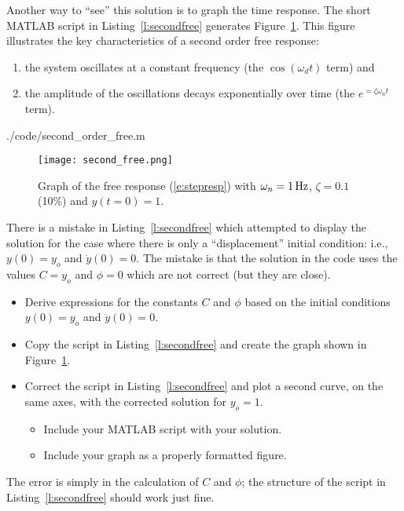 Another way to ``see'' this solution is to graph the time response.  The short MATLAB script in Listing~\ref{l:secondfree} generates Figure~\ref{f:secondfree}.  This figure illustrates the key characteristics of a second order free response:
\begin{enumerate}
\item the system oscillates at a constant frequency (the $\cos(\omega_d t)$ term) and
\item the amplitude of the oscillations decays exponentially over time (the $e^{=\zeta \omega_n t}$ term).
\end{enumerate}
%


{./code/second_order_free.m}


\begin{figure}[hbt]
\centering
\texttt{[image: second\_free.png]}
\caption{Graph of the free response (\ref{e:stepresp}) with $\omega_n= \unit[1]{Hz}$, $\zeta=0.1$ (10\%) and $y(t=0)=1$.}
\label{f:secondfree}
\end{figure}

\begin{ex}
There is a mistake in Listing~\ref{l:secondfree} which attempted to display the solution for the case where there is only a ``displacement'' initial condition: i.e., $y(0)=y_o$ and $\dot{y}(0)=0$.  The mistake is that the solution in the code uses the values $C=y_o$ and $\phi=0$ which are not correct (but they are close). 
\begin{itemize}\label{ex:secondresp}
\item Derive expressions for the constants $C$ and $\phi$ based on the initial conditions $y(0)=y_o$ and $\dot{y}(0)=0$.
\item Copy the script in Listing~\ref{l:secondfree} and create the graph shown in Figure~\ref{f:secondfree}.
\item Correct the script in Listing~\ref{l:secondfree} and plot a second curve, on the same axes, with the corrected solution for $y_o=1$.  
  \begin{itemize}
  \item Include your MATLAB script with your solution.
  \item Include your graph as a properly formatted figure.
  \end{itemize}
\end{itemize}
The error is simply in the calculation of $C$ and $\phi$; the structure of the script in Listing~\ref{l:secondfree} should work just fine.
\end{ex}

